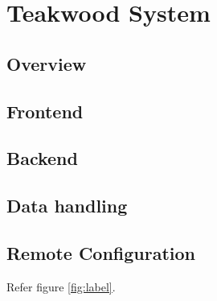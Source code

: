 \chapter{Teakwood System }

\section{Overview}
\section{Frontend}
\section{Backend}
\section{Data handling}
\section{Remote Configuration}

%
%

Refer figure \ref{fig:label}.

